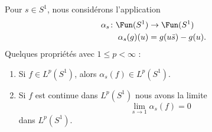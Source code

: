 \begin{lemma}
    Pour \( s\in S^1\), nous considérons l'application
    \begin{equation}
        \begin{aligned}
            \alpha_s\colon \Fun(S^1)&\to \Fun(S^1) \\
            \alpha_s(g)(u)&=g(u\bar s)-g(u).
        \end{aligned}
    \end{equation}
    Quelques propriétés avec \( 1\leq p<\infty\) :
    \begin{enumerate}
        \item
            Si \( f\in L^p(S^1)\), alors \( \alpha_s(f)\in L^p(S^1)\).
        \item
            Si \( f\) est continue dans \( L^p(S^1)\) nous avons la limite
            \begin{equation}
                \lim_{s\to 1} \alpha_s(f)=0
            \end{equation}
            dans \( L^p(S^1)\).
    \end{enumerate}
\end{lemma}

